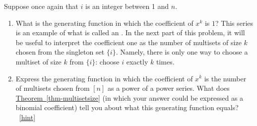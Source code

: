 \documentclass{book}
\begin{document}
\setcounter{project}{250}
\addtocounter{project}{-1}
\begin{activity}[]\label{activity-243}
\hypertarget{p-1356}{}%
Suppose once again that \(i\) is an integer between 1 and \(n\).%
\begin{enumerate}[font=\bfseries,label=(\alph*),ref=\alph*]
\item\label{task-245} \hypertarget{p-1357}{}%
What is the generating function in which the coefficient of \(x^k\) is \(1\)? This series is an example of what is called an . In the next part of this problem, it will be useful to interpret the coefficient one as the number of multisets of size \(k\) chosen from the singleton set \(\{i\}\). Namely, there is only one way to choose a multiset of size \(k\) from \(\{i\}\): choose \(i\) exactly \(k\) times.%
\item\label{task-246} \hypertarget{p-1359}{}%
Express the generating function in which the coefficient of \(x^k\) is the number of multisets chosen from \([n]\) as a power of a power series.  What does \hyperref[thm-multisetsize]{Theorem~\ref{thm-multisetsize}} (in which your answer could be expressed as a binomial coefficient) tell you about what this generating function equals?%
~\hfill{\tiny\hyperlink{a-250.b}{[hint]}\hypertarget{q-250.b}{}}\end{enumerate}
\end{activity}
\end{document}
